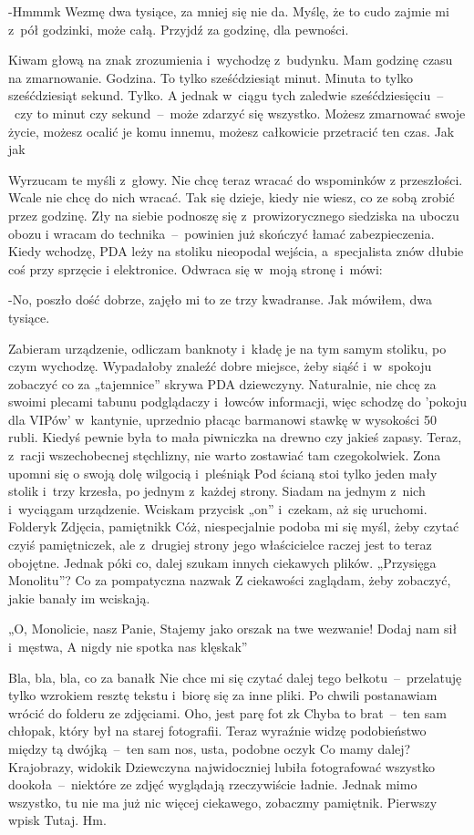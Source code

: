 \documentclass[../MAIN.tex]{subfiles}
\begin{document}
-Hmmm\3k Wezmę dwa tysiące, za mniej się nie da. Myślę, że to
cudo zajmie mi z~pół godzinki, może całą. Przyjdź za godzinę,
dla pewności.

Kiwam głową na znak zrozumienia i~wychodzę z~budynku. Mam
godzinę czasu na zmarnowanie.
%
%
Godzina. To tylko sześćdziesiąt minut. Minuta to tylko
sześćdziesiąt sekund. Tylko. A jednak w~ciągu tych zaledwie
sześćdziesięciu~--~czy to minut czy sekund~--~może zdarzyć się
wszystko. Możesz zmarnować swoje życie, możesz ocalić je komu
innemu, możesz całkowicie przetracić ten czas. Jak ja\3k

Wyrzucam te myśli z~głowy. Nie chcę teraz wracać do wspominków
z przeszłości. Wcale nie chcę do nich wracać. Tak się dzieje,
kiedy nie wiesz, co ze sobą zrobić przez godzinę. Zły na siebie
podnoszę się z~prowizorycznego siedziska na uboczu obozu i
wracam do technika~--~powinien już skończyć łamać
zabezpieczenia. Kiedy wchodzę, PDA leży na stoliku nieopodal
wejścia, a~specjalista znów dłubie coś przy sprzęcie i
elektronice. Odwraca się w~moją stronę i~mówi:

-No, poszło dość dobrze, zajęło mi to ze trzy kwadranse. Jak
mówiłem, dwa tysiące.

Zabieram urządzenie, odliczam banknoty i~kła\-dę je na tym
samym
stoliku, po czym wychodzę. Wypadałoby znaleźć dobre miejsce,
żeby siąść i~w~spokoju zobaczyć co za „tajemnice” skrywa PDA
dziewczyny. Naturalnie, nie chcę za swoimi plecami tabunu
podglądaczy i~łowców informacji, więc schodzę do 'pokoju dla
VIPów' w~kantynie, uprzednio płacąc barmanowi stawkę w
wysokości 50 rubli. Kiedyś pewnie była to mała piwniczka na
drewno czy jakieś zapasy. Teraz, z~racji wszechobecnej
stęchlizny, nie warto zostawiać tam czegokolwiek. Zona upomni
się o swoją dolę wilgocią i~pleśnią\3k Pod ścianą stoi tylko
jeden mały stolik i~trzy krzesła, po jednym z~każdej strony.
Siadam na jednym z~nich i~wyciągam urządzenie. Wciskam przycisk
„on” i~czekam, aż się uruchomi. Foldery\3k Zdjęcia,
pamiętnik\3k Cóż, niespecjalnie podoba mi się myśl, żeby czytać
czyiś pamiętniczek, ale z~drugiej strony jego właścicielce
raczej jest to teraz obojętne. Jednak póki co, dalej szukam
innych ciekawych plików. „Przysięga Monolitu”? Co za
pompatyczna nazwa\3k Z ciekawości zaglądam, żeby zobaczyć,
jakie banały im wciskają.

„O, Monolicie, nasz Panie,
Stajemy jako orszak na twe wezwanie!
Dodaj nam sił i~męstwa,
A nigdy nie spotka nas klęska\3k”

Bla, bla, bla, co za banał\3k Nie chce mi się czytać dalej tego
bełkotu~--~przelatuję tylko wzrokiem resztę tekstu i~biorę się
za inne pliki. Po chwili postanawiam wrócić do folderu ze
zdjęciami. Oho, jest parę fot z\3k Chyba to brat~--~ten sam
chłopak, który był na starej fotografii. Teraz wyraźnie widzę
podobieństwo między tą dwójką~--~ten sam nos, usta, podobne
oczy\3k Co mamy dalej? Krajobrazy, widoki\3k Dziewczyna
najwidoczniej lubiła fotografować wszystko dookoła~--~niektóre
ze zdjęć wyglądają rzeczywiście ładnie. Jednak mimo wszystko,
tu nie ma już nic więcej ciekawego, zobaczmy pamiętnik.
Pierwszy wpis\3k Tutaj. Hm.
\end{document}
